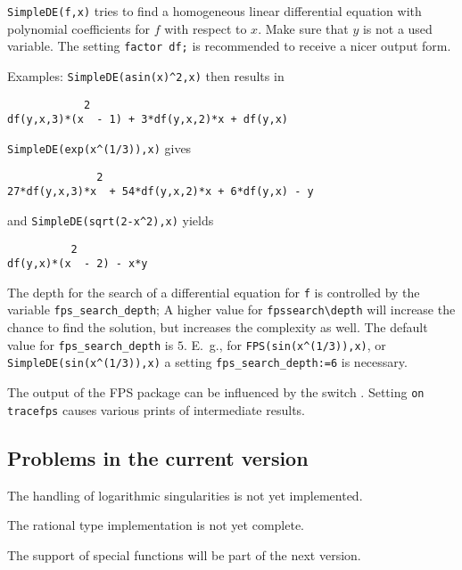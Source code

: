 {\tt SimpleDE(f,x)} tries to find a homogeneous linear differential
equation with polynomial coefficients for $f$ with respect to $x$.
Make sure that $y$ is not a used variable.
The setting {\tt factor df;} is recommended to receive a nicer output form.

Examples: {\tt SimpleDE(asin(x)\verb+^+2,x)} then results in
\begin{verbatim}
            2
df(y,x,3)*(x  - 1) + 3*df(y,x,2)*x + df(y,x)
\end{verbatim}
{\tt SimpleDE(exp(x\verb+^+(1/3)),x)} gives
\begin{verbatim}
              2
27*df(y,x,3)*x  + 54*df(y,x,2)*x + 6*df(y,x) - y
\end{verbatim}
and {\tt SimpleDE(sqrt(2-x\verb+^+2),x)} yields
\begin{verbatim}
          2
df(y,x)*(x  - 2) - x*y
\end{verbatim}
\hypertarget{reserved:FPS_SEARCH_DEPTH}{}
The depth for the search of a differential equation for {\tt f} is
controlled by the variable {\tt fps\_search\_depth};
A higher value for {\tt fps\verb_search\_depth}
will increase the chance to find the solution, but increases the
complexity as well. The default value for {\tt fps\_search\_depth} 
is $5$. E.~g., for {\tt FPS(sin(x\^{}(1/3)),x)}, or 
{\tt SimpleDE(sin(x\^{}(1/3)),x)} a setting
{\tt fps\_search\_depth:=6} is necessary.

\hypertarget{switch:TRACEFPS}{}
The output of the FPS package can be influenced by the
switch . Setting {\tt on tracefps} causes various
prints of intermediate results.

\subsection{Problems in the current version}
The handling of logarithmic singularities is not yet implemented.

The rational type implementation is not yet complete.

The support of special functions \cite{Koepf:94c}
will be part of the next version.
